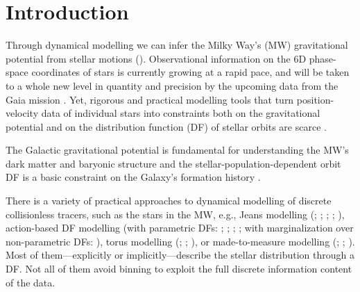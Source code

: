 \documentclass[iop,revtex4,numberedappendix,appendixfloats]{emulateapj}
\begin{document}

\section{Introduction} \label{sec:intro}

Through dynamical modelling we can infer the Milky Way's (MW) gravitational potential from stellar motions (\citealt{2008gady.book.....B,2011Prama..77...39B,2013A&ARv..21...61R}). Observational information on the 6D phase-space coordinates of stars is currently growing at a rapid pace, and will be taken to a whole new level in quantity and precision by the upcoming data from the Gaia mission \citep{2001A&A...369..339P}. Yet, rigorous and practical modelling tools that turn position-velocity data of individual stars into constraints both on the gravitational potential and on the distribution function (DF) of stellar orbits are scarce \citep{2013A&ARv..21...61R}.

The Galactic gravitational potential is fundamental for understanding the MW's dark matter and baryonic structure \citep{2012sf2a.conf...15F,2013A&ARv..21...61R,2013PhR...531....1S,2014JPhG...41f3101R} and the stellar-population-dependent orbit DF is a basic constraint on the Galaxy's formation history \citep{2013NewAR..57...29B,2015MNRAS.449.3479S}.

There is a variety of practical approaches to dynamical modelling of discrete collisionless tracers, such as the stars in the MW, e.g., Jeans modelling (\citealt{1989MNRAS.239..605K}; \citealt{2012ApJ...756...89B}; \citealt{2012MNRAS.425.1445G}; \citealt{2013ApJ...772..108Z}; \citealt{2015MNRAS.452..956B}), action-based DF modelling (with parametric DFs: \citealt{2013ApJ...779..115B}; \citealt{2014MNRAS.445.3133P}; \citealt{2015MNRAS.449.3479S}; \citealt{2016arXiv160309332D}; with marginalization over non-parametric DFs: \citealt{2014MNRAS.437.2230M}), torus modelling (\citealt{2008MNRAS.390..429M}; \citealt{2012MNRAS.419.2251M}; \citealt{2013MNRAS.433.1411M}), or made-to-measure modelling (\citealt{1996MNRAS.282..223S}; \citealt{2007MNRAS.376...71D}; \citealt{2014MNRAS.443.2112H}). Most of them---explicitly or implicitly---describe the stellar distribution through a DF. Not all of them avoid binning to exploit the full discrete information content of the data.
\end{document}
